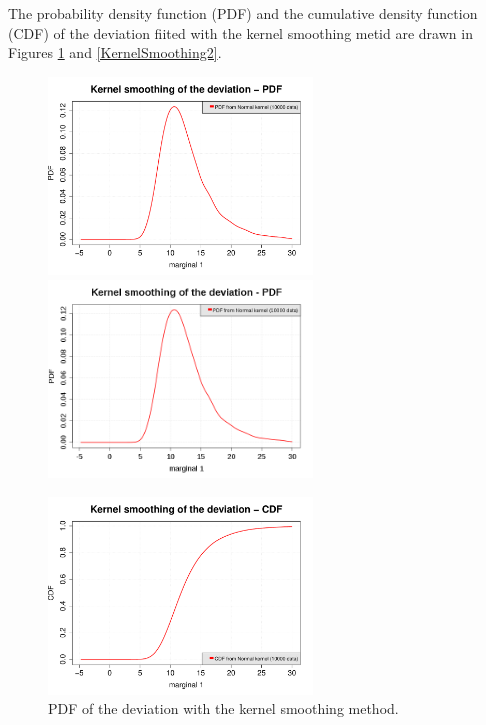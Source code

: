 \documentclass[11pt]{article}
\begin{document}
The probability density function (PDF) and the cumulative density function (CDF) of the deviation fiited with the kernel smoothing metid are drawn in Figures \ref{KernelSmoothing} and  \ref{KernelSmoothing2}.



\begin{figure}[Hhbtp]
  \begin{minipage}{9.8cm}
    \begin{center}
      \ifpdf
      \includegraphics[width=7cm]{smoothedPDF.pdf}
      \else
      \includegraphics[width=7cm]{smoothedPDF.png}
      \fi
      \caption{PDF of the deviation with the kernel smoothing method.}
      \label{KernelSmoothing}
    \end{center}
  \end{minipage}
  \hfill
  \begin{minipage}{9.8cm}
    \begin{center}
      \ifpdf
      \includegraphics[width=7cm]{smoothedCDF.pdf}

\end{center}
\end{minipage}
\end{figure}
\end{document}
